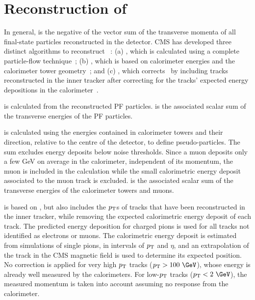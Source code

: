 
\section{Reconstruction of \texorpdfstring{\bigmet}{MET}}
\label{sec:algorithms}

In general, \vecmet is the negative of the vector
sum of the transverse momenta of all
final-state particles reconstructed in the detector.
CMS has developed three distinct algorithms to reconstruct \vecmet\ :
(a) \pfmet, which is calculated using a complete
particle-flow technique~\cite{PFT-09-001};
(b) \calomet, which is based on calorimeter energies and the calorimeter
tower geometry~\cite{METPas07}; and
(c) \tcmet, which corrects \calomet\ by including tracks reconstructed
in the inner tracker after  correcting for the tracks' expected energy
depositions in the calorimeter~\cite{JME-09-010}.






\pfmet is calculated from the reconstructed PF particles.
\pfsumet is the associated scalar sum of the transverse energies of the PF particles.



\calomet is calculated using the energies contained in calorimeter towers and their
direction, relative to the centre of the detector,
to define
pseudo-particles.  The sum excludes energy deposits
below noise thresholds.
Since a
muon deposits only a few GeV on average  in the calorimeter,
independent of its momentum, the muon \pt
is included in the \calomet calculation
while the small calorimetric energy deposit
associated to the muon track is excluded.
\calosumet is the associated scalar sum of the transverse energies of the
calorimeter towers and muons.


\tcmet
is based on \calomet, but also
includes the $p_{\rm T}$s of tracks that have been
reconstructed in the inner tracker, while removing the expected
calorimetric energy deposit  of each track.
The predicted energy deposition for charged pions is used for all
tracks not identified as electrons or muons.
The calorimetric energy deposit is
estimated from simulations of single pions, in intervals of $p_{\rm T}$ and
$\eta$, and an extrapolation of the track in the CMS
magnetic field is used to determine its expected position.
No correction is applied for very high $p_{\rm T}$ tracks
($p_{\rm T}>100~\GeV$), whose energy is already well measured  by the
calorimeters. For low-$p_{\rm T}$ tracks ($p_{\rm T}<2~\GeV$), the measured
momentum is taken into account
assuming
no response from the calorimeter.






